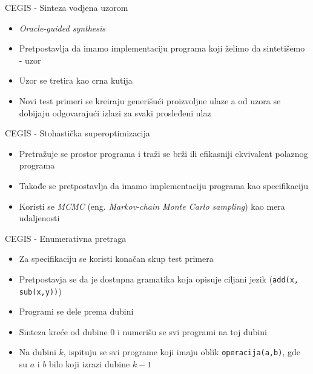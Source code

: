 
\begin{frame}{CEGIS - Sinteza vodjena uzorom}
    \begin{itemize}
        \item \emph{Oracle-guided synthesis}
        \item Pretpostavlja da imamo implementaciju programa koji želimo da sintetišemo - uzor
        \item Uzor se tretira kao crna kutija
        \item Novi test primeri se kreiraju generišući proizvoljne ulaze a od uzora se dobijaju odgovarajući izlazi za svaki prosleđeni ulaz
    \end{itemize}
\end{frame}

\begin{frame}{CEGIS - Stohastička superoptimizacija}
    \begin{itemize}
        \item Pretražuje se prostor programa i traži se brži ili efikasniji ekvivalent polaznog programa
        \item Takođe se pretpostavlja da imamo implementaciju programa kao specifikaciju
        \item Koristi se \emph{MCMC} (eng. \emph{Markov-chain Monte Carlo sampling}) kao mera udaljenosti
    \end{itemize}
\end{frame}

\begin{frame}{CEGIS - Enumerativna pretraga}
    \begin{itemize}
        \item Za specifikaciju se koristi konačan skup test primera
        \item Pretpostavja se da je dostupna gramatika koja opisuje ciljani jezik (\texttt{add(x, sub(x,y))})
        \item Programi se dele prema dubini
        \item Sinteza kreće od dubine $0$ i numerišu se svi programi na toj dubini
        \item Na dubini $k$, ispituju se svi programe koji imaju oblik \texttt{operacija(a,b)}, gde su $a$ i $b$ bilo koji izrazi dubine $k-1$
    \end{itemize}
\end{frame}
